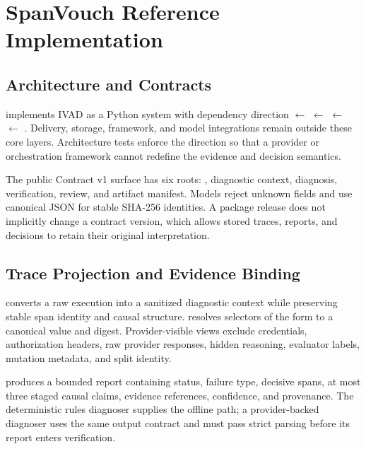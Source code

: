 \section{SpanVouch Reference Implementation}
\label{sec:implementation}



\subsection{Architecture and Contracts}

\system implements IVAD as a Python system with dependency direction
 $\leftarrow$  $\leftarrow$ 
$\leftarrow$  $\leftarrow$ . Delivery,
storage, framework, and model integrations remain outside these core layers.
Architecture tests enforce the direction so that a provider or orchestration
framework cannot redefine the evidence and decision semantics.

The public Contract v1 surface has six roots: \traceir, diagnostic context,
diagnosis, verification, review, and artifact manifest. Models reject unknown
fields and use canonical JSON for stable SHA-256 identities. A package release
does not implicitly change a contract version, which allows stored traces,
reports, and decisions to retain their original interpretation.

\subsection{Trace Projection and Evidence Binding}

 converts a raw execution into a sanitized diagnostic
context while preserving stable span identity and causal structure.
 resolves selectors of the form
 to a canonical value and digest. Provider-visible
views exclude credentials, authorization headers, raw provider responses,
hidden reasoning, evaluator labels, mutation metadata, and split identity.

 produces a bounded report containing status, failure
type, decisive spans, at most three staged causal claims, evidence references,
confidence, and provenance. The deterministic rules diagnoser supplies the
offline path; a provider-backed diagnoser uses the same output contract and
must pass strict parsing before its report enters verification.

